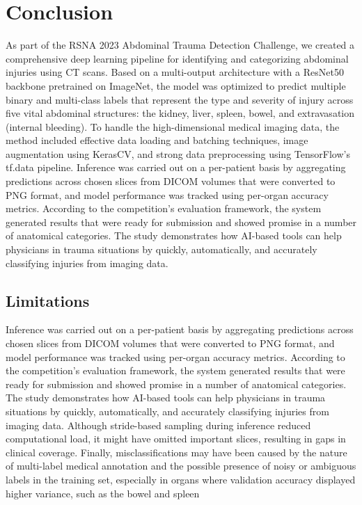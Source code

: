 \documentclass[a4paper,12pt]{article}
\begin{document}
\section{Conclusion}
As part of the RSNA 2023 Abdominal Trauma Detection Challenge, we created a comprehensive deep learning pipeline for identifying and categorizing abdominal injuries using CT scans. Based on a multi-output architecture with a ResNet50 backbone pretrained on ImageNet, the model was optimized to predict multiple binary and multi-class labels that represent the type and severity of injury across five vital abdominal structures: the kidney, liver, spleen, bowel, and extravasation (internal bleeding). To handle the high-dimensional medical imaging data, the method included effective data loading and batching techniques, image augmentation using KerasCV, and strong data preprocessing using TensorFlow's tf.data pipeline. Inference was carried out on a per-patient basis by aggregating predictions across chosen slices from DICOM volumes that were converted to PNG format, and model performance was tracked using per-organ accuracy metrics. According to the competition's evaluation framework, the system generated results that were ready for submission and showed promise in a number of anatomical categories. The study demonstrates how AI-based tools can help physicians in trauma situations by quickly, automatically, and accurately classifying injuries from imaging data.

\subsection{Limitations}
Inference was carried out on a per-patient basis by aggregating predictions across chosen slices from DICOM volumes that were converted to PNG format, and model performance was tracked using per-organ accuracy metrics. According to the competition's evaluation framework, the system generated results that were ready for submission and showed promise in a number of anatomical categories. The study demonstrates how AI-based tools can help physicians in trauma situations by quickly, automatically, and accurately classifying injuries from imaging data. Although stride-based sampling during inference reduced computational load, it might have omitted important slices, resulting in gaps in clinical coverage. Finally, misclassifications may have been caused by the nature of multi-label medical annotation and the possible presence of noisy or ambiguous labels in the training set, especially in organs where validation accuracy displayed higher variance, such as the bowel and spleen
\end{document}
